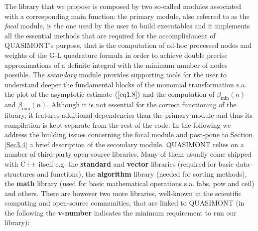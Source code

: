 \documentclass[a4paper, twosided]{book}
\begin{document}
\noindent
The library that we propose is composed by two so-called modules associated with a corresponding \colorbox{poliGrayBlue}{main} function: the primary module, also referred to as the {\itshape focal} module, is the one used by the user to build executables and it implements all the essential methods that are required for the accomplishment of QUASIMONT's purpose, that is the computation of ad-hoc processed nodes and weights of the G-L quadrature formula in order to achieve double precise approximations of a definite integral with the minimum number of nodes possible. The {\itshape secondary} module provides supporting tools for the user to understand deeper the fundamental blocks of the monomial transformation s.a. the plot of the asymptotic estimate $(\ref{eq1.8})$ and the computation of $\beta_{\text{min}}(n)$ and $\beta_{\text{min}}(n)$. Although it is not essential for the correct functioning of the library, it features additional dependencies than the primary module and thus its compilation is kept separate from the rest of the code. In the following we address the building issues concerning the focal module and post-pone to Section \ref{Sec3.4} a brief description of the secondary module.
\newline
\noindent 
QUASIMONT relies on a number of third-party open-source libraries. Many of them usually come shipped with C++ itself e.g. the \color{poliDarkBlue} \textbf{standard} \color{black} and \color{poliDarkBlue} \textbf{vector} \color{black} libraries (required for basic data-structures and functions), the \color{poliDarkBlue} \textbf{algorithm} \color{black} library (needed for sorting methods), the \color{poliDarkBlue} \textbf{math} \color{black} library (used for basic mathematical operations s.a. \colorbox{poliGrayBlue}{fabs}, \colorbox{poliGrayBlue}{pow} and \colorbox{poliGrayBlue}{ceil}) and others. There are however two more libraries, well-known in the scientific computing and open-source communities, that are linked to QUASIMONT (in the following the \color{poliDarkBlue} \textbf{v-number} \color{black} indicates the minimum requirement to run our library):
\end{document}
